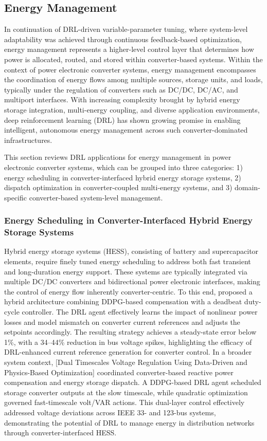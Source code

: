 \subsection{Energy Management}
\label{sec:ctrl_energymgmt}

In continuation of DRL-driven variable-parameter tuning, where system-level adaptability was achieved through continuous feedback-based optimization, energy management represents a higher-level control layer that determines how power is allocated, routed, and stored within converter-based systems. Within the context of power electronic converter systems, energy management encompasses the coordination of energy flows among multiple sources, storage units, and loads, typically under the regulation of converters such as DC/DC, DC/AC, and multiport interfaces. With increasing complexity brought by hybrid energy storage integration, multi-energy coupling, and diverse application environments, deep reinforcement learning (DRL) has shown growing promise in enabling intelligent, autonomous energy management across such converter-dominated infrastructures.

This section reviews DRL applications for energy management in power electronic converter systems, which can be grouped into three categories: 1) energy scheduling in converter-interfaced hybrid energy storage systems, 2) dispatch optimization in converter-coupled multi-energy systems, and 3) domain-specific converter-based system-level management.

\subsubsection{Energy Scheduling in Converter-Interfaced Hybrid Energy Storage Systems}

Hybrid energy storage systems (HESS), consisting of battery and supercapacitor elements, require finely tuned energy scheduling to address both fast transient and long-duration energy support. These systems are typically integrated via multiple DC/DC converters and bidirectional power electronic interfaces, making the control of energy flow inherently converter-centric. To this end, \cite{zhang2025deep} proposed a hybrid architecture combining DDPG-based compensation with a deadbeat duty-cycle controller. The DRL agent effectively learns the impact of nonlinear power losses and model mismatch on converter current references and adjusts the setpoints accordingly. The resulting strategy achieves a steady-state error below 1\%, with a 34–44\% reduction in bus voltage spikes, highlighting the efficacy of DRL-enhanced current reference generation for converter control. In a broader system context, [Dual Timescales Voltage Regulation Using Data-Driven and Physics-Based Optimization] coordinated converter-based reactive power compensation and energy storage dispatch. A DDPG-based DRL agent scheduled storage converter outputs at the slow timescale, while quadratic optimization governed fast-timescale volt/VAR actions. This dual-layer control effectively addressed voltage deviations across IEEE 33- and 123-bus systems, demonstrating the potential of DRL to manage energy in distribution networks through converter-interfaced HESS.

